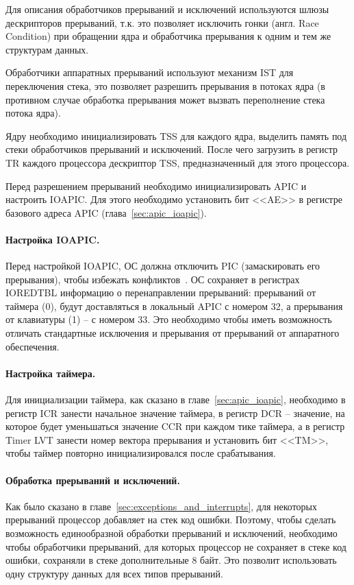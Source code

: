 Для описания обработчиков прерываний и исключений используются шлюзы дескрипторов прерываний,
т.к. это позволяет исключить гонки (англ. Race Condition) при обращении ядра и обработчика
прерывания к одним и тем же структурам данных.

Обработчики аппаратных прерываний используют механизм IST для переключения стека, это позволяет
разрешить прерывания в потоках ядра (в противном случае обработка прерывания может вызвать
переполнение стека потока ядра).

Ядру необходимо инициализировать TSS для каждого ядра, выделить память под стеки обработчиков
прерываний и исключений. После чего загрузить в регистр TR каждого процессора дескриптор TSS,
предназначенный для этого процессора.

Перед разрешением прерываний необходимо инициализировать APIC и настроить IOAPIC. Для этого
необходимо установить бит <<AE>> в регистре базового адреса APIC (глава~\ref{sec:apic_ioapic}).

\paragraph{Настройка IOAPIC.} Перед настройкой IOAPIC, ОС должна отключить PIC (замаскировать его прерывания),
чтобы избежать конфликтов~\cite{os_dev}. ОС сохраняет в регистрах IOREDTBL информацию о перенаправлении
прерываний: прерываний от таймера (0), будут доставляться в локальный APIC с номером 32, а прерывания от
клавиатуры (1) -- с номером 33. Это необходимо чтобы иметь возможность отличать стандартные исключения и
прерывания от прерываний от аппаратного обеспечения.

\paragraph{Настройка таймера.} Для инициализации таймера, как сказано в главе~\ref{sec:apic_ioapic},
необходимо в регистр ICR занести начальное значение таймера, в регистр DCR -- значение, на которое
будет уменьшаться значение CCR при каждом тике таймера, а в регистр Timer LVT занести номер вектора прерывания и
установить бит <<TM>>, чтобы таймер повторно инициализировался после срабатывания.

\paragraph{Обработка прерываний и исключений.} Как было сказано в главе~\ref{sec:exceptions_and_interrupts},
для некоторых прерываний процессор добавляет на стек код ошибки. Поэтому, чтобы сделать возможность единообразной
обработки прерываний и исключений, необходимо чтобы обработчики прерываний, для которых процессор не сохраняет в стеке
код ошибки, сохраняли в стеке дополнительные 8 байт. Это позволит использовать одну структуру данных для всех типов прерываний.

